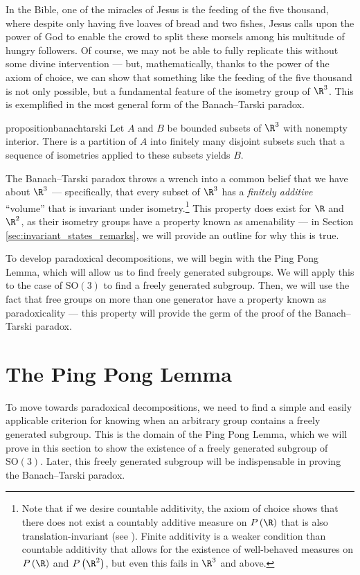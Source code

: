 In the Bible, one of the miracles of Jesus is the feeding of the five thousand, where despite only having five loaves of bread and two fishes, Jesus calls upon the power of God to enable the crowd to split these morsels among his multitude of hungry followers. Of course, we may not be able to fully replicate this without some divine intervention --- but, mathematically, thanks to the power of the axiom of choice, we can show that something like the feeding of the five thousand is not only possible, but a fundamental feature of the isometry group of $\R^3$. This is exemplified in the most general form of the Banach--Tarski paradox.
\begin{restatable}{proposition}{banachtarski}\label{prop:banachtarski}
  Let $A$ and $B$ be bounded subsets of $\R^3$ with nonempty interior. There is a partition of $A$ into finitely many disjoint subsets such that a sequence of isometries applied to these subsets yields $B$.
\end{restatable}
The Banach--Tarski paradox throws a wrench into a common belief that we have about $\R^3$ --- specifically, that every subset of $\R^3$ has a \textit{finitely additive} ``volume'' that is invariant under isometry.\footnote{Note that if we desire countable additivity, the axiom of choice shows that there does not exist a countably additive measure on $P\left(\R\right)$ that is also translation-invariant (see \cite[Section 1.1]{folland_real_analysis}). Finite additivity is a weaker condition than countable additivity that allows for the existence of well-behaved measures on $P\left(\R\right)$ and $P\left(\R^2\right)$, but even this fails in $\R^3$ and above.} This property does exist for $\R$ and $\R^2$, as their isometry groups have a property known as amenability --- in Section \ref{sec:invariant_states_remarks}, we will provide an outline for why this is true.\newline

To develop paradoxical decompositions, we will begin with the Ping Pong Lemma, which will allow us to find freely generated subgroups. We will apply this to the case of $\text{SO}(3)$ to find a freely generated subgroup. Then, we will use the fact that free groups on more than one generator have a property known as paradoxicality --- this property will provide the germ of the proof of the Banach--Tarski paradox.
\section{The Ping Pong Lemma}\label{sec:ping_pong_lemma}%
To move towards paradoxical decompositions, we need to find a simple and easily applicable criterion for knowing when an arbitrary group contains a freely generated subgroup. This is the domain of the Ping Pong Lemma, which we will prove in this section to show the existence of a freely generated subgroup of $\text{SO}(3)$. Later, this freely generated subgroup will be indispensable in proving the Banach--Tarski paradox.\newline

